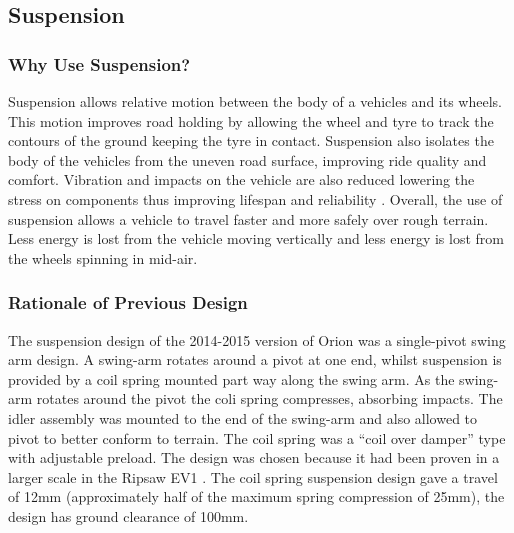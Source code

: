 \subsection{Suspension}
\subsubsection{Why Use Suspension?}
Suspension allows relative motion between the body of a vehicles and its wheels. This motion improves road holding by allowing the wheel and tyre to track the contours of the ground keeping the tyre in contact. Suspension also isolates the body of the vehicles from the uneven road surface, improving ride quality and comfort. Vibration and impacts on the vehicle are also reduced lowering the stress on components thus improving lifespan and reliability \cite{Jazar2009}. Overall, the use of suspension allows a vehicle to travel faster and more safely over rough terrain. Less energy is lost from the vehicle moving vertically and less energy is lost from the wheels spinning in mid-air.

\subsubsection{Rationale of Previous Design}
The suspension design of the 2014-2015 version of Orion was a single-pivot swing arm design. A swing-arm rotates around a pivot at one end, whilst suspension is provided by a coil spring mounted part way along the swing arm. As the swing-arm rotates around the pivot the coli spring compresses, absorbing impacts. The idler assembly was mounted to the end of the swing-arm and also allowed to pivot to better conform to terrain. The coil spring was a “coil over damper” type with adjustable preload. The design was chosen because it had been proven in a larger scale in the Ripsaw EV1 \cite{Howe09}. The coil spring suspension design gave a travel of 12mm (approximately half of the maximum spring compression of 25mm), the design has ground clearance of 100mm.


